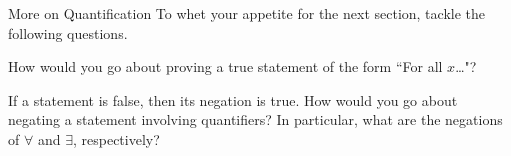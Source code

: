 \begin{section}{More on Quantification}
To whet your appetite for the next section, tackle the following questions.

\begin{question}
How would you go about proving a true statement of the form ``For all $x$\ldots"?
\end{question}

\begin{question}
If a statement is false, then its negation is true.  How would you go about negating a statement involving quantifiers?  In particular, what are the negations of $\forall$ and $\exists$, respectively?
\end{question}

\end{section}